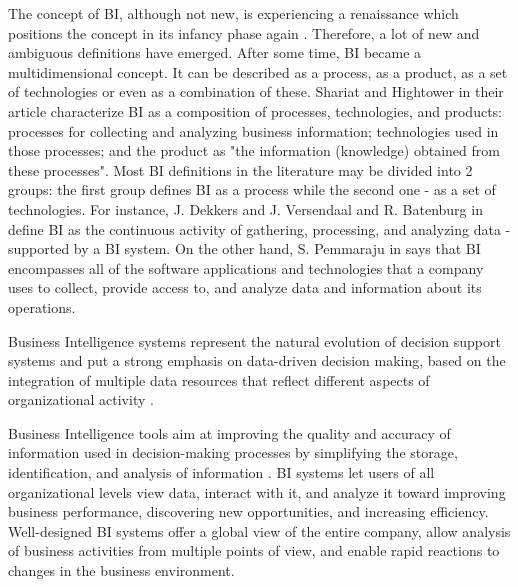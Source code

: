 \documentclass[runningheads]{llncs}
\begin{document}
The concept of BI, although not new, is experiencing a renaissance which positions the concept in its infancy phase again \cite{SHOLLO}. Therefore, a lot of new and ambiguous definitions have emerged. After some time, BI became a multidimensional concept. It can be described as a process, as a product, as a set of technologies or even as a combination of these. Shariat and Hightower in their article \cite{SHARIAT} characterize BI as a composition of processes, technologies, and products: processes for collecting and analyzing business information; technologies used in those processes; and the product as "the information (knowledge) obtained from these processes". Most BI definitions in the literature may be divided into 2 groups: the first group defines BI as a process while the second one - as a set of technologies. For instance, J. Dekkers and J. Versendaal and R. Batenburg in \cite{DEKKERS} define BI as the continuous activity of gathering, processing, and analyzing data - supported by a BI system. On the other hand, S. Pemmaraju in \cite{RELATION} says that BI encompasses all of the software applications and technologies that a company uses to collect, provide access to, and analyze data and information about its operations. 

Business Intelligence systems represent the natural evolution of decision support systems and put a strong emphasis on data-driven decision making, based on the integration of multiple data resources that reflect different aspects of organizational activity \cite{YOGEV}.

Business Intelligence tools aim at improving the quality and accuracy of information used in decision-making processes by simplifying the storage, identification, and analysis of information \cite{NEGASH}. BI systems let users of all organizational levels view data, interact with it, and analyze it toward improving business performance, discovering new opportunities, and increasing efficiency. Well-designed BI systems offer a global view of the entire company, allow analysis of business activities from multiple points of view, and enable rapid reactions to changes in the business environment.
\end{document}
